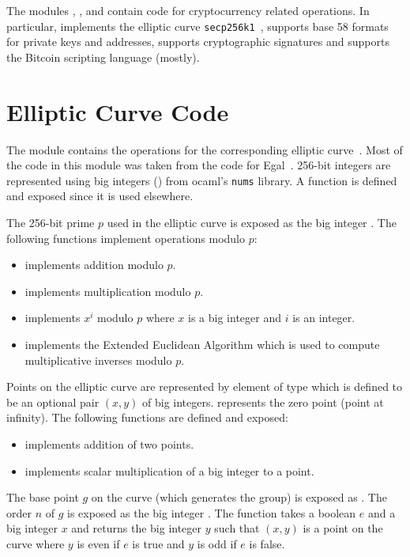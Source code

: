 The modules , ,  and 
contain code for cryptocurrency related operations.
In particular,  implements the elliptic curve {\tt{secp256k1}}~\cite{sec2final},
 supports base 58 formats for private keys and addresses,
 supports cryptographic signatures
and  supports the Bitcoin scripting language (mostly).

\section{Elliptic Curve Code}

The module  contains the operations for the corresponding elliptic curve~\cite{sec2final}.
Most of the code in this module was taken from the code for Egal~\cite{Brown2014}.
256-bit integers are represented using big integers () from ocaml's {\tt{nums}} library.
A function {} is defined and exposed since it is used elsewhere.

The 256-bit prime $p$ used in the elliptic curve is
exposed as the big integer {}.
The following functions implement operations modulo $p$:
\begin{itemize}
\item {} implements addition modulo $p$.
\item {} implements multiplication modulo $p$.
\item {} implements $x^i$ modulo $p$ where $x$ is a big integer and $i$ is an integer.
\item {} implements the Extended Euclidean Algorithm which is used to compute
multiplicative inverses modulo $p$.
\end{itemize}

Points on the elliptic curve are represented by element of type {}
which is defined to be an optional pair $(x,y)$ of big integers.
{} represents the zero point (point at infinity).
The following functions are defined and exposed:
\begin{itemize}
\item {} implements addition of two points.
\item {} implements scalar multiplication of a big integer to a point.
\end{itemize}

The base point $g$ on the curve (which generates the group) is exposed as {}.
The order $n$ of $g$ is exposed as the big integer {}.
The function {} takes a boolean $e$ and a big integer $x$
and returns the big integer $y$ such that $(x,y)$ is a point on the curve
where $y$ is even if $e$ is true
and $y$ is odd if $e$ is false.

